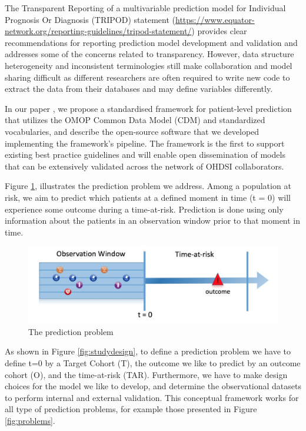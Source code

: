 \documentclass[]{book}
\begin{document}
The Transparent Reporting of a multivariable prediction model for
Individual Prognosis Or Diagnosis (TRIPOD) statement
(\url{https://www.equator-network.org/reporting-guidelines/tripod-statement/})
provides clear recommendations for reporting prediction model
development and validation and addresses some of the concerns related to
transparency. However, data structure heterogeneity and inconsistent
terminologies still make collaboration and model sharing difficult as
different researchers are often required to write new code to extract
the data from their databases and may define variables differently.

In our paper \citep{reps2018}, we propose a standardised framework for
patient-level prediction that utilizes the OMOP Common Data Model (CDM)
and standardized vocabularies, and describe the open-source software
that we developed implementing the framework's pipeline. The framework
is the first to support existing best practice guidelines and will
enable open dissemination of models that can be extensively validated
across the network of OHDSI collaborators.

Figure \ref{fig:figure1}, illustrates the prediction problem we address.
Among a population at risk, we aim to predict which patients at a
defined moment in time (t = 0) will experience some outcome during a
time-at-risk. Prediction is done using only information about the
patients in an observation window prior to that moment in time.

\begin{figure}
\includegraphics[width=1\linewidth]{images/PatientLevelPrediction/Figure1} \caption{The prediction problem}\label{fig:figure1}
\end{figure}

As shown in Figure \ref{fig:studydesign}, to define a prediction problem
we have to define t=0 by a Target Cohort (T), the outcome we like to
predict by an outcome cohort (O), and the time-at-risk (TAR).
Furthermore, we have to make design choices for the model we like to
develop, and determine the observational datasets to perform internal
and external validation. This conceptual framework works for all type of
prediction problems, for example those presented in Figure
\ref{fig:problems}.
\end{document}
